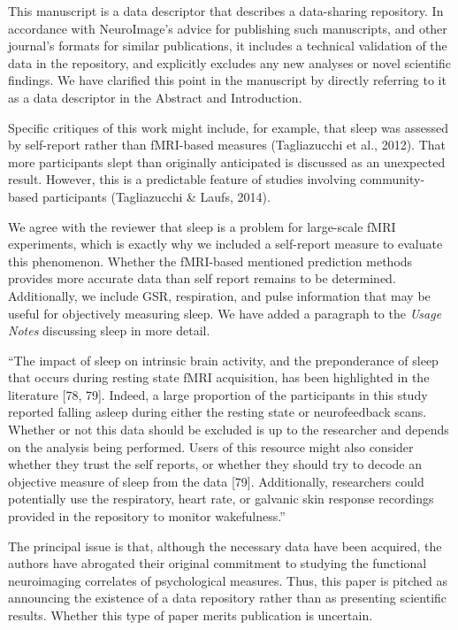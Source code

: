 \documentclass{article}
\newcommand{\RESPONSE}[1]{\textcolor{responseblue}{#1}}
\begin{document}
\RESPONSE{This manuscript is a data descriptor that describes a data-sharing repository. In accordance with NeuroImage's advice for publishing such manuscripts, and other journal's formats for similar publications, it includes a technical validation of the data in the repository, and explicitly excludes any new analyses or novel scientific findings. We have clarified this point in the manuscript by directly referring to it as a data descriptor in the Abstract and Introduction.}

Specific critiques of this work might include, for example, that sleep was assessed by self-report rather than fMRI-based measures (Tagliazucchi et al., 2012). That more participants slept than originally anticipated is discussed as an unexpected result. However, this is a predictable feature of studies involving community-based participants (Tagliazucchi \& Laufs, 2014). 

\RESPONSE{We agree with the reviewer that sleep is a problem for large-scale fMRI experiments, which is exactly why we included a self-report measure to evaluate this phenomenon. Whether the fMRI-based mentioned prediction methods provides more accurate data than self report remains to be determined. Additionally, we include GSR, respiration, and pulse information that may be useful for objectively measuring sleep. We have added a paragraph to the \emph{Usage Notes} discussing sleep in more detail.}

\RESPONSE{``The impact of sleep on intrinsic brain activity, and the preponderance of sleep that occurs during resting state fMRI acquisition, has been highlighted in the literature  [78, 79]. Indeed, a large proportion of the participants in this  study  reported  falling  asleep during either the resting state or neurofeedback scans. Whether or not this  data should be excluded is up to the researcher and depends on the analysis being performed. Users of this resource might also consider whether they trust the self reports, or whether they should try to decode an objective measure of sleep from the data [79]. Additionally, researchers could potentially use the respiratory, heart rate, or galvanic skin response recordings provided in the repository to monitor wakefulness.''}

The principal issue is that, although the necessary data have been acquired, the authors have abrogated their original commitment to studying the functional neuroimaging correlates of psychological measures. Thus, this paper is pitched as announcing the existence of a data repository rather than as presenting scientific results. Whether this type of paper merits publication is uncertain.
\end{document}
